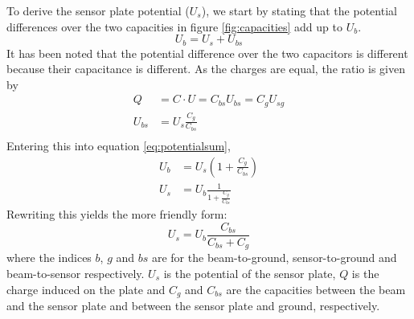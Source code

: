 To derive the sensor plate potential ($U_s$), we start by stating that the potential differences over the two capacities in figure \ref{fig:capacities} add up to $U_b$.
\begin{equation}
U_b = U_s + U_{bs}
\label{eq:potentialsum}
\end{equation}
It has been noted that the potential difference over the two capacitors is different because their capacitance is different. As the charges are equal, the ratio is given by
\begin{align*}
Q &= C\cdot U = C_{bs} U_{bs} = C_g U_{sg} \\
U_{bs} &= U_s\frac{C_g}{C_{bs}} \\
\end{align*}
Entering this into equation \ref{eq:potentialsum},
\begin{align*}
U_b &= U_s \left(1+ \frac{C_g}{C_{bs}} \right) \\
U_s &= U_b \frac{1}{1+\frac{C_g}{C_{bs}}} 
\end{align*}
Rewriting this yields the more friendly form:
\begin{equation}
U_s = U_b \frac{C_{bs}}{C_{bs}+C_g}
\label{eq:vplatec}
\end{equation}
where the indices $b$, $g$ and $bs$ are for the beam-to-ground, sensor-to-ground and beam-to-sensor respectively. $U_s$ is the potential of the sensor plate, $Q$ is the charge induced on the plate and $C_g$ and $C_{bs}$ are the capacities between the beam and the sensor plate and between the sensor plate and ground, respectively.

